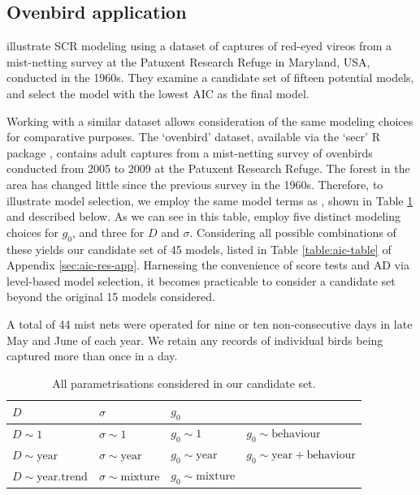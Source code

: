 \documentclass{article}
\begin{document}
\subsection{Ovenbird application}
\label{sec:data-set}

\textcite{borchersEfford2008} illustrate SCR modeling using a dataset
of captures of 
red-eyed vireos from a mist-netting survey at the Patuxent Research Refuge 
in Maryland, USA, conducted in the 1960s. They examine a candidate set of 
fifteen potential models, and select the model with the lowest
AIC as the final model.

Working with a similar dataset allows consideration of the same
modeling choices for comparative purposes. The `ovenbird' dataset, 
available via the `secr' R package \parencite{secr-pkg}, contains adult captures from a 
mist-netting survey of ovenbirds conducted from 2005 to 2009 at the Patuxent
Research Refuge. The forest in the area has
changed little since the previous survey in the 1960s. Therefore, to
illustrate model selection, we employ the same model terms as 
\textcite{borchersEfford2008}, shown in Table
\ref{table:dependencies} and described below. As we can see in this table,
\textcite{borchersEfford2008} employ five distinct
modeling choices for $g_0$, and three for $D$ and $\sigma$. Considering all possible
combinations of these yields our
candidate set of 45 models, listed in Table \ref{table:aic-table} of
Appendix \ref{sec:aic-res-app}. Harnessing the convenience of score tests
and AD via level-based model selection, it becomes practicable to
consider a candidate set beyond the original 15 models considered.

A total of 44 mist nets were operated for nine or
ten non-consecutive days in late May and June of each year. We retain any 
records of individual birds being captured more than once in a
day. 

\begin{table}[h!]
  \centering
\begin{tabular} { l l l l }
  \hline
  \hline
  \textbf{$D$} & \textbf{$\sigma$} &
                                             \multicolumn{2}{l}{\textbf{$g_0$}} 
  \\
  \hline
  $D \sim 1$ & $\sigma \sim 1$  & $g_0 \sim 1$ & $g_0 \sim \text{behaviour}$ \\
  $D \sim \text{year}$ & $\sigma \sim \text{year}$ & $g_0 \sim
                                                           \text{year}$
             &  $g_0 \sim \text{year} + \text{behaviour}$ \\
  $D \sim \text{year.trend}$ & $\sigma \sim \text{mixture}$ & $g_0 \sim
                                                      \text{mixture}$ & \\
  \hline
\end{tabular}
\caption{All parametrisations considered in our candidate set.}
\label{table:dependencies}
\end{table}
\end{document}
